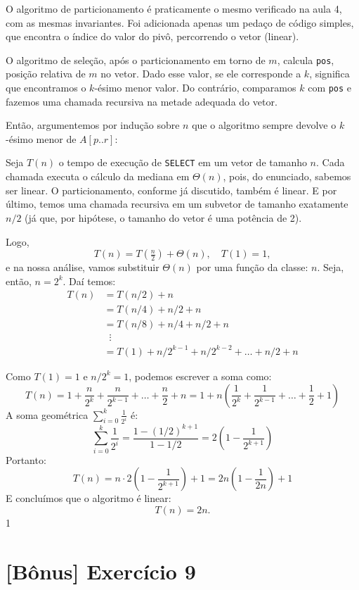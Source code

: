 \documentclass[a4paper,12pt]{article}
\begin{document}
O algoritmo de particionamento é praticamente o mesmo verificado na aula 4, com as mesmas invariantes. Foi adicionada apenas um pedaço de código simples, que encontra o índice do valor do pivô, percorrendo o vetor (linear).

O algoritmo de seleção, após o particionamento em torno de $m$, calcula \verb|pos|, posição relativa de $m$ no vetor. Dado esse valor, se ele corresponde a $k$, significa que encontramos o $k$-ésimo menor valor. Do contrário, comparamos $k$ com \verb|pos| e fazemos uma chamada recursiva na metade adequada do vetor.

Então, argumentemos por indução sobre $n$ que o algoritmo sempre devolve o $k$-ésimo menor de $A[p..r]$:


Seja $T(n)$ o tempo de execução de \texttt{SELECT} em um vetor de tamanho $n$. Cada chamada executa o cálculo da mediana em $\Theta(n)$, pois, do enunciado, sabemos ser linear. O particionamento, conforme já discutido, também é linear. E por último, temos uma chamada recursiva em um subvetor de tamanho exatamente $n/2$ (já que, por hipótese, o tamanho do vetor é uma potência de 2).

Logo,
\[
T(n) = T\!\left(\tfrac{n}{2}\right) + \Theta(n), 
\quad T(1) = 1,
\]
e na nossa análise, vamos substituir $\Theta(n)$ por uma função da classe: $n$. Seja, então, $n = 2^k$. Daí temos:
\begin{align*}
	T(n) &= T(n/2) + n \\
	&= T(n/4) + n/2 + n \\
	&= T(n/8) + n/4 + n/2 + n \\
	&\;\;\vdots \\
	&= T(1) + n/2^{k-1} + n/2^{k-2} + \dots + n/2 + n
\end{align*}

Como $T(1) = 1$ e $n / 2^k = 1$, podemos escrever a soma como:
\[
T(n) = 1 + \frac{n}{2^k} + \frac{n}{2^{k-1}} + \dots + \frac{n}{2} + n
= 1 + n \left( \frac{1}{2^k} + \frac{1}{2^{k-1}} + \dots + \frac{1}{2} + 1 \right)
\]
A soma geométrica $\sum_{i=0}^{k} \frac{1}{2^i}$ é:
\[
\sum_{i=0}^{k} \frac{1}{2^i} = \frac{1 - (1/2)^{k+1}}{1 - 1/2} = 2 \left( 1 - \frac{1}{2^{k+1}} \right)
\]
Portanto:
\[
T(n) = n \cdot 2 \left(1 - \frac{1}{2^{k+1}}\right) + 1
= 2 n \left(1 - \frac{1}{2n}\right) + 1
\]
E concluímos que o algoritmo é linear:
\[
T(n) = 2n.
\]1
\newpage

\section*{[Bônus] Exercício 9}
\end{document}
